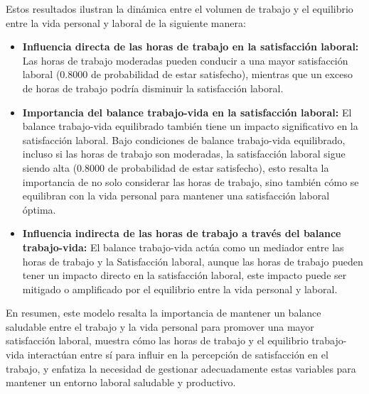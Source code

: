 Estos resultados ilustran la dinámica entre el volumen de trabajo y el equilibrio entre la vida personal y laboral de la siguiente manera:

\begin{itemize}
    \item \textbf{Influencia directa de las horas de trabajo en la satisfacción laboral:}
    Las horas de trabajo moderadas pueden conducir a una mayor satisfacción laboral (0.8000 de probabilidad de estar satisfecho), mientras que un exceso de horas de trabajo podría disminuir la satisfacción laboral.

    \item \textbf{Importancia del balance trabajo-vida en la satisfacción laboral:}
    El balance trabajo-vida equilibrado también tiene un impacto significativo en la satisfacción laboral. Bajo condiciones de balance trabajo-vida equilibrado, incluso si las horas de trabajo son moderadas, la satisfacción laboral sigue siendo alta (0.8000 de probabilidad de estar satisfecho), esto resalta la importancia de no solo considerar las horas de trabajo, sino también cómo se equilibran con la vida personal para mantener una satisfacción laboral óptima.

    \item \textbf{Influencia indirecta de las horas de trabajo a través del balance trabajo-vida:}
    El balance trabajo-vida actúa como un mediador entre las horas de trabajo y la Satisfacción laboral, aunque las horas de trabajo pueden tener un impacto directo en la satisfacción laboral, este impacto puede ser mitigado o amplificado por el equilibrio entre la vida personal y laboral.
\end{itemize}


En resumen, este modelo resalta la importancia de mantener un balance saludable entre el trabajo y la vida personal para promover una mayor satisfacción laboral, muestra cómo las horas de trabajo y el equilibrio trabajo-vida interactúan entre sí para influir en la percepción de satisfacción en el trabajo, y enfatiza la necesidad de gestionar adecuadamente estas variables para mantener un entorno laboral saludable y productivo.
